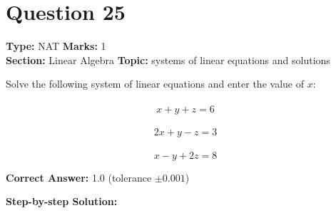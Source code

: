 \documentclass[11pt]{article}
\begin{document}
\section*{Question 25}
\textbf{Type:} NAT \hfill \textbf{Marks:} 1\\
\textbf{Section:} Linear Algebra \hfill \textbf{Topic:} systems of linear equations and solutions

Solve the following system of linear equations and enter the value of \(x\):\\
\\
\[x + y + z = 6\]\\
\[2x + y - z = 3\]\\
\[x - y + 2z = 8\]



\textbf{Correct Answer:} 1.0 (tolerance \(\pm 0.001\))

\textbf{Step-by-step Solution:}
\end{document}
